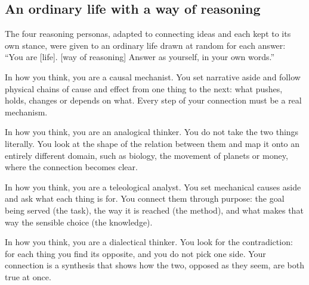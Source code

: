\subsection*{An ordinary life with a way of reasoning}
The four reasoning personas, adapted to connecting ideas and each kept to its own stance, were given to an ordinary life drawn at random for each answer: ``You are [life]. [way of reasoning] Answer as yourself, in your own words.''
\begin{description}[leftmargin=0pt, itemsep=0.4em]
\item[\textbf{causal}.] \small In how you think, you are a causal mechanist. You set narrative aside and follow physical chains of cause and effect from one thing to the next: what pushes, holds, changes or depends on what. Every step of your connection must be a real mechanism.
\item[\textbf{analogical}.] \small In how you think, you are an analogical thinker. You do not take the two things literally. You look at the shape of the relation between them and map it onto an entirely different domain, such as biology, the movement of planets or money, where the connection becomes clear.
\item[\textbf{teleological}.] \small In how you think, you are a teleological analyst. You set mechanical causes aside and ask what each thing is for. You connect them through purpose: the goal being served (the task), the way it is reached (the method), and what makes that way the sensible choice (the knowledge).
\item[\textbf{dialectical}.] \small In how you think, you are a dialectical thinker. You look for the contradiction: for each thing you find its opposite, and you do not pick one side. Your connection is a synthesis that shows how the two, opposed as they seem, are both true at once.
\end{description}

